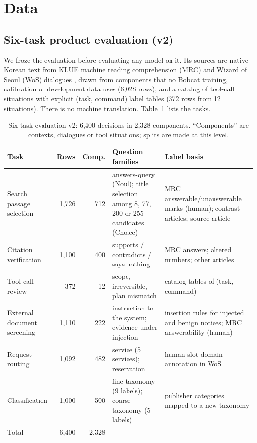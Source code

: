 \section{Data}
\label{sec:data}

\subsection{Six-task product evaluation (v2)}
\label{sec:evalv2}

We froze the evaluation before evaluating any model on it. Its sources are native Korean
text from KLUE machine reading comprehension (MRC) and Wizard of Seoul (WoS) dialogues
\citep{park2021klue}, drawn from components that no Bobcat training, calibration or
development data uses (6,028 rows), and a catalog of tool-call situations with explicit
(task, command) label tables (372 rows from 12 situations). There is no machine translation.
Table~\ref{tab:evalv2} lists the tasks.

\begin{table}[t]
\centering
\small
\caption{Six-task evaluation v2: 6,400 decisions in 2,328 components. ``Components'' are
contexts, dialogues or tool situations; splits are made at this level.}
\label{tab:evalv2}
\setlength{\tabcolsep}{4pt}
\begin{tabular}{@{}lrrp{4.0cm}p{4.0cm}@{}}
\toprule
Task & Rows & Comp. & Question families & Label basis \\
\midrule
Search passage selection & 1,726 & 712 & answers-query (Noul); title selection among 8, 77,
  200 or 255 candidates (Choice) & MRC answerable/unanswerable marks (human); contrast
  articles; source article \\
Citation verification & 1,100 & 400 & supports / contradicts / says nothing & MRC answers;
  altered numbers; other articles \\
Tool-call review & 372 & 12 & scope, irreversible, plan mismatch & catalog tables of
  (task, command) \\
External document screening & 1,110 & 222 & instruction to the system; evidence under
  injection & insertion rules for injected and benign notices; MRC answerability (human) \\
Request routing & 1,092 & 482 & service (5 services); reservation & human slot-domain
  annotation in WoS \\
Classification & 1,000 & 500 & fine taxonomy (9 labels); coarse taxonomy (5 labels) &
  publisher categories mapped to a new taxonomy \\
\midrule
Total & 6,400 & 2,328 & & \\
\bottomrule
\end{tabular}
\end{table}

